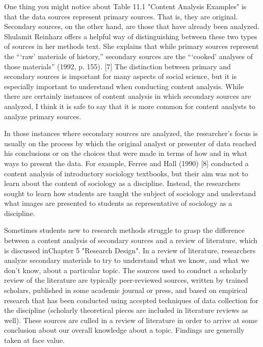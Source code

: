 One thing you might notice about Table 11.1 "Content Analysis Examples" is that the data sources represent primary sources. That is, they are original. Secondary sources, on the other hand, are those that have already been analyzed. Shulamit Reinharz offers a helpful way of distinguishing between these two types of sources in her methods text. She explains that while primary sources represent the “‘raw’ materials of history,” secondary sources are the “‘cooked’ analyses of those materials” (1992, p. 155). [7] The distinction between primary and secondary sources is important for many aspects of social science, but it is especially important to understand when conducting content analysis. While there are certainly instances of content analysis in which secondary sources are analyzed, I think it is safe to say that it is more common for content analysts to analyze primary sources.

In those instances where secondary sources are analyzed, the researcher’s focus is usually on the process by which the original analyst or presenter of data reached his conclusions or on the choices that were made in terms of how and in what ways to present the data. For example, Ferree and Hall (1990) [8] conducted a content analysis of introductory sociology textbooks, but their aim was not to learn about the content of sociology as a discipline. Instead, the researchers sought to learn how students are taught the subject of sociology and understand what images are presented to students as representative of sociology as a discipline.

Sometimes students new to research methods struggle to grasp the difference between a content analysis of secondary sources and a review of literature, which is discussed inChapter 5 "Research Design". In a review of literature, researchers analyze secondary materials to try to understand what we know, and what we don’t know, about a particular topic. The sources used to conduct a scholarly review of the literature are typically peer-reviewed sources, written by trained scholars, published in some academic journal or press, and based on empirical research that has been conducted using accepted techniques of data collection for the discipline (scholarly theoretical pieces are included in literature reviews as well). These sources are culled in a review of literature in order to arrive at some conclusion about our overall knowledge about a topic. Findings are generally taken at face value.

